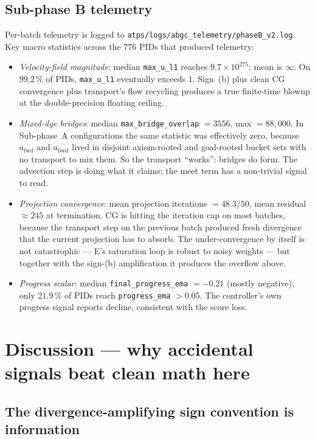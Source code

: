 \documentclass[11pt]{article}
\newcommand{\lpath}[1]{\texttt{\nolinkurl{#1}}}
\newcommand{\lid}[1]{{\ttfamily\nolinkurl{#1}}}
\begin{document}
\subsection{Sub-phase B telemetry}\label{sec:telemetry}

Per-batch telemetry is logged to
\lpath{atps/logs/abgc_telemetry/phaseB_v2.log}. Key macro statistics across
the $776$ PIDs that produced telemetry:
\begin{itemize}
\item \emph{Velocity-field magnitude}: median \lid{max_u_l1} reaches
      $9.7\times 10^{275}$; mean is $\infty$. On $99.2\,\%$ of PIDs,
      \lid{max_u_l1} eventually exceeds $1$. Sign~(b) plus clean CG
      convergence plus transport's flow recycling produces a true
      finite-time blowup at the double-precision floating ceiling.
\item \emph{Mixed-dye bridges}: median \lid{max_bridge_overlap} $= 3556$,
      max $= 88{,}000$. In Sub-phase~A configurations the same statistic
      was effectively zero, because $a_\mathrm{fwd}$ and $a_\mathrm{bwd}$
      lived in disjoint axiom-rooted and goal-rooted bucket sets with no
      transport to mix them. So the transport ``works'': bridges do form.
      The advection step is doing what it claims; the meet term has
      a non-trivial signal to read.
\item \emph{Projection convergence}: mean projection iterations
      $= 48.3 / 50$, mean residual $\approx 245$ at termination. CG is
      hitting the iteration cap on most batches, because the
      transport step on the previous batch produced fresh divergence
      that the current projection has to absorb. The
      under-convergence by itself is not catastrophic --- E's saturation
      loop is robust to noisy weights --- but together with the
      sign-(b) amplification it produces the overflow above.
\item \emph{Progress scalar}: median \lid{final_progress_ema} $= -0.21$
      (mostly negative); only $21.9\,\%$ of PIDs reach
      \lid{progress_ema} $> 0.05$. The controller's own progress signal
      reports decline, consistent with the score loss.
\end{itemize}

\section{Discussion --- why accidental signals beat clean math here}\label{sec:discussion}

\subsection{The divergence-amplifying sign convention is information}
\end{document}
